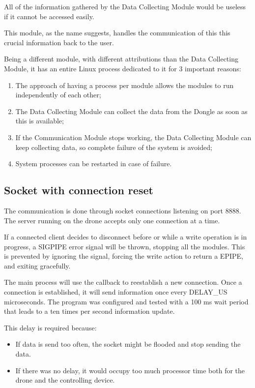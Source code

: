 All of the information gathered by the Data Collecting Module would be useless if it cannot be accessed easily.

This module, as the name suggests, handles the communication of this this crucial information back to the user.

Being a different module, with different attributions than the Data Collecting Module, it has an entire Linux process dedicated to it for 3 important reasons:
\begin{enumerate}

\item The approach of having a process per module allows the modules to run independently of each other;
\item The Data Collecting Module can collect the data from the Dongle as soon as this is available;
\item If the Communication Module stops working, the Data Collecting Module can keep collecting data, so complete failure of the system is avoided;
\item System processes can be restarted in case of failure.

\end{enumerate}

\subsection{Socket with connection reset}

The communication is done through socket connections listening on port 8888. The server running on the drone accepts only one connection at a time.

If a connected client decides to disconnect before or while a write operation is in progress, a SIGPIPE error signal will be thrown, stopping all the modules. This is prevented by ignoring the signal, forcing the write action to return a EPIPE, and exiting gracefully.

The main process will use the callback  to reestablish a new connection. Once a connection is established, it will send information once every DELAY\_US microseconds. The program was configured and tested with a 100 ms wait period that leads to a ten times per second information update.

This delay is required because:
\begin{itemize}

\item If data is send too often, the socket might be flooded and stop sending the data. %
\item If there was no delay, it would occupy too much processor time both for the drone and the controlling device.

\end{itemize}

